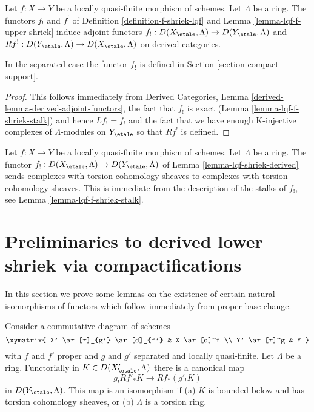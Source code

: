 \begin{lemma}
\label{lemma-lqf-shriek-derived}
Let $f : X \to Y$ be a locally quasi-finite morphism of schemes.
Let $\Lambda$ be a ring. The functors $f_!$ and $f^!$ of
Definition \ref{definition-f-shriek-lqf} and
Lemma \ref{lemma-lqf-f-upper-shriek}
induce adjoint functors $f_! : D(X_\etale, \Lambda) \to D(Y_\etale, \Lambda)$
and $Rf^! : D(Y_\etale, \Lambda) \to D(X_\etale, \Lambda)$
on derived categories.
\end{lemma}

\noindent
In the separated case the functor $f_!$ is defined in
Section \ref{section-compact-support}.

\begin{proof}
This follows immediately from
Derived Categories, Lemma \ref{derived-lemma-derived-adjoint-functors},
the fact that $f_!$ is exact (Lemma \ref{lemma-lqf-f-shriek-stalk})
and hence $Lf_! = f_!$
and the fact that we have enough K-injective complexes of $\Lambda$-modules
on $Y_\etale$ so that $Rf^!$ is defined.
\end{proof}

\begin{remark}
\label{remark-lqf-shriek-derived-torsion}
Let $f : X \to Y$ be a locally quasi-finite morphism of schemes. Let
$\Lambda$ be a ring. The functor
$f_! : D(X_\etale, \Lambda) \to D(Y_\etale, \Lambda)$ of
Lemma \ref{lemma-lqf-shriek-derived}
sends complexes with torsion cohomology sheaves
to complexes with torsion cohomology sheaves.
This is immediate from the description of the stalks of $f_!$,
see Lemma \ref{lemma-lqf-f-shriek-stalk}.
\end{remark}





\section{Preliminaries to derived lower shriek via compactifications}
\label{section-prelim}

\noindent
In this section we prove some lemmas on the existence of
certain natural isomorphisms of functors which follow immediately
from proper base change.

\begin{lemma}
\label{lemma-shriek-proper-and-open}
Consider a commutative diagram of schemes
$$
\xymatrix{
X' \ar[r]_{g'} \ar[d]_{f'} & X \ar[d]^f \\
Y' \ar[r]^g & Y
}
$$
with $f$ and $f'$ proper and $g$ and $g'$ separated and locally quasi-finite.
Let $\Lambda$ be a ring. Functorially in $K \in D(X'_\etale, \Lambda)$
there is a canonical map
$$
g_!Rf'_*K \longrightarrow Rf_*(g'_!K)
$$
in $D(Y_\etale, \Lambda)$. This map is an isomorphism if
(a) $K$ is bounded below and has torsion cohomology sheaves, or
(b) $\Lambda$ is a torsion ring.
\end{lemma}

